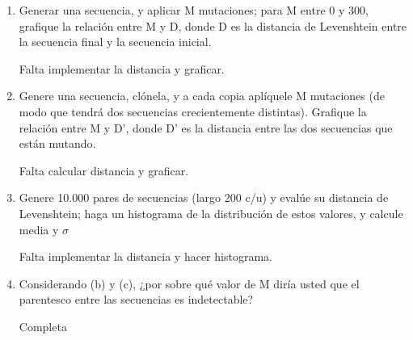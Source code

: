 \begin{enumerate}

	\item Generar una secuencia, y aplicar M mutaciones; para M entre 0 y 300, grafique la relación
		entre M y D, donde D es la distancia de Levenshtein entre la secuencia final y la secuencia
		inicial.


		 Falta implementar la distancia y graficar.

	\item Genere una secuencia, clónela, y a cada copia aplíquele M mutaciones (de modo que tendrá
		dos secuencias crecientemente distintas). Grafique la relación entre M y D’, donde D’ es la
		distancia entre las dos secuencias que están mutando.


		 Falta calcular distancia y graficar.


	\item Genere 10.000 pares de secuencias (largo 200 c/u) y evalúe su distancia de Levenshtein; haga
		un histograma de la distribución de estos valores, y calcule media y $\sigma$


		 Falta implementar la distancia y hacer histograma.


	\item Considerando (b) y (c), ¿por sobre qué valor de M diría usted que el parentesco entre las
		secuencias es indetectable?


		 Completa


\end{enumerate}
